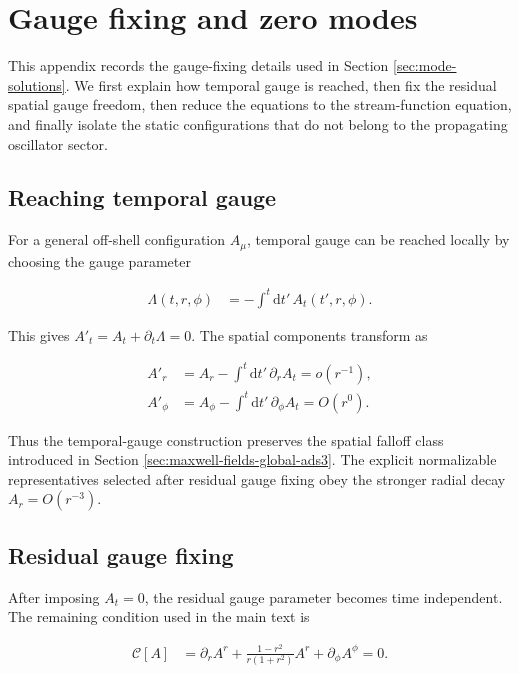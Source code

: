\section{Gauge fixing and zero modes}\label{app:gauge-fixing-zero-modes}

This appendix records the gauge-fixing details used in Section \ref{sec:mode-solutions}. We first explain how temporal gauge is reached, then fix the residual spatial gauge freedom, then reduce the equations to the stream-function equation, and finally isolate the static configurations that do not belong to the propagating oscillator sector.

\subsection{Reaching temporal gauge}\label{subsec:app-reaching-temporal-gauge}

For a general off-shell configuration $A_{\mu}$, temporal gauge can be reached locally by choosing the gauge parameter

\begin{align}
\Lambda(t,r,\phi)&=-\int^{t}\mathrm{d}t'\,A_{t}(t',r,\phi).
\end{align}

This gives $A'_{t}=A_{t}+\partial_{t}\Lambda=0$. The spatial components transform as

\begin{align}
A'_{r}&=A_{r}-\int^{t}\mathrm{d}t'\,\partial_{r}A_{t}=o(r^{-1}), \\
A'_{\phi}&=A_{\phi}-\int^{t}\mathrm{d}t'\,\partial_{\phi}A_{t}=O(r^{0}).
\end{align}

Thus the temporal-gauge construction preserves the spatial falloff class introduced in Section \ref{sec:maxwell-fields-global-ads3}. The explicit normalizable representatives selected after residual gauge fixing obey the stronger radial decay $A_{r}=O(r^{-3})$.

\subsection{Residual gauge fixing}\label{subsec:app-residual-gauge-fixing}

After imposing $A_{t}=0$, the residual gauge parameter becomes time independent. The remaining condition used in the main text is

\begin{align}
\mathcal{C}[A]&=\partial_{r}A^{r}+\frac{1-r^{2}}{r(1+r^{2})}A^{r}+\partial_{\phi}A^{\phi}=0.
\end{align}

